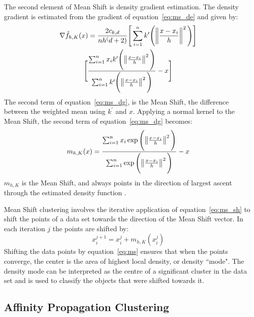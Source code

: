 The second element of Mean Shift is density gradient estimation. 
The density gradient is estimated from the gradient of equation~\ref{eq:ms_de} and given by: 
\begin{multline}
\label{eq:ms_dg}
\nabla\hat{f}_{h,K}(x) = \frac{2c_{k,d}}{nh^(d+2)} \Bigg[ \sum_{i=1}^n k^{\prime} \Bigg( \norm{\frac{x-x_{i}}{h}}^2 \Bigg) \Bigg] \\ \Bigg[\frac{\sum_{i=1}^n x_{i}k^{\prime} \Bigg( \norm{\frac{x-x_{i}}{h}}^2 \Bigg)}{\sum_{i=1}^n k^{\prime} \Bigg( \norm{\frac{x-x_{i}}{h}}^2 \Bigg)} - x \Bigg]
\end{multline}
The second term of equation~\ref{eq:ms_dg}, is the Mean Shift, the difference between the weighted mean using $k^{\prime}$ and $x$.
Applying a normal kernel to the Mean Shift, the second term of equation~\ref{eq:ms_dg} becomes: 
\begin{equation} 
\label{eq:ms_sh}
m_{h,K}(x) = \frac{\sum_{i=1}^n x_{i} \exp \Bigg(\norm{\frac{x-x_{i}}{h}}^2 \Bigg)}{\sum_{i=1}^n \exp \Bigg(\norm{\frac{x-x_{i}}{h}}^2 \Bigg)} - x
\end{equation}
$m_{h,K}$ is the Mean Shift, and always points in the direction of largest ascent through the estimated density function \citet{vatturi09}.

Mean Shift clustering involves the iterative application of equation~\ref{eq:ms_sh} to shift the points of a data set towards the direction of the Mean Shift vector.
In each iteration $j$ the points are shifted by: 
\begin{equation}
\label{eq:ms}
x_i^{j+1} = x_i^j + m_{h,K}(x_i^j)
\end{equation}
Shifting the data points by equation~\ref{eq:ms} ensures that when the points converge, the center is the area of highest local density, or density ``mode". 
The density mode can be interpreted as the centre of a significant cluster in the data set and is used to classify the objects that were shifted towards it.

\subsection{Affinity Propagation Clustering}
\label{sec:methods_ap}

